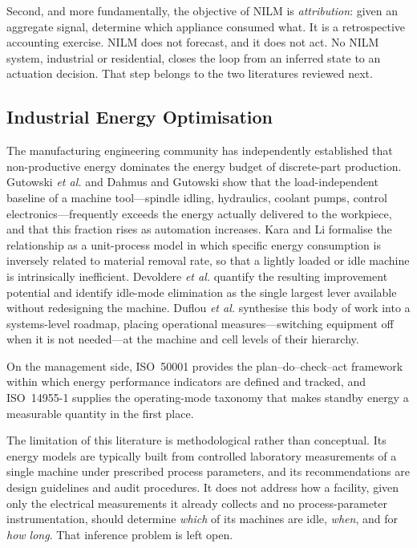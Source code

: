 Second, and more fundamentally, the objective of NILM is
\emph{attribution}: given an aggregate signal, determine which appliance
consumed what. It is a retrospective accounting exercise. NILM does not
forecast, and it does not act. No NILM system, industrial or
residential, closes the loop from an inferred state to an actuation
decision. That step belongs to the two literatures reviewed next.


\subsection{Industrial Energy Optimisation}
\label{sec:rw:industrial}

The manufacturing engineering community has independently established
that non-productive energy dominates the energy budget of discrete-part
production. Gutowski \textit{et al.} \cite{gutowski2006electrical} and
Dahmus and Gutowski \cite{dahmus2004environmental} show that the
load-independent baseline of a machine tool---spindle idling, hydraulics,
coolant pumps, control electronics---frequently exceeds the energy
actually delivered to the workpiece, and that this fraction rises as
automation increases. Kara and Li \cite{kara2011unit} formalise the
relationship as a unit-process model in which specific energy
consumption is inversely related to material removal rate, so that a
lightly loaded or idle machine is intrinsically inefficient. Devoldere
\textit{et al.} \cite{devoldere2007improvement} quantify the resulting
improvement potential and identify idle-mode elimination as the single
largest lever available without redesigning the machine. Duflou
\textit{et al.} \cite{duflou2012towards} synthesise this body of work
into a systems-level roadmap, placing operational measures---switching
equipment off when it is not needed---at the machine and cell levels of
their hierarchy.

On the management side, ISO~50001 \cite{iso50001} provides the
plan--do--check--act framework within which energy performance
indicators are defined and tracked, and ISO~14955-1 \cite{iso14955}
supplies the operating-mode taxonomy that makes standby energy a
measurable quantity in the first place.

The limitation of this literature is methodological rather than
conceptual. Its energy models are typically built from controlled
laboratory measurements of a single machine under prescribed process
parameters, and its recommendations are design guidelines and audit
procedures. It does not address how a facility, given only the
electrical measurements it already collects and no process-parameter
instrumentation, should determine \emph{which} of its machines are idle,
\emph{when}, and for \emph{how long}. That inference problem is left
open.


